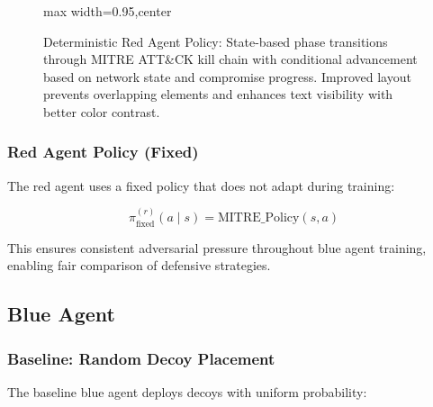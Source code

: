 \documentclass[12pt,oneside,a4paper]{article}
\newcounter{phase}[algorithm]
\theoremstyle{definition}
\theoremstyle{plain}
\begin{document}
\begin{figure}[H]
\begin{adjustbox}{max width=0.95\linewidth,center}
\end{adjustbox}
\caption{Deterministic Red Agent Policy: State-based phase transitions through MITRE ATT\&CK kill chain with conditional advancement based on network state and compromise progress. Improved layout prevents overlapping elements and enhances text visibility with better color contrast.}
\label{fig:red_agent_policy}
\end{figure}

\subsubsection{Red Agent Policy (Fixed)}
The red agent uses a fixed policy that does not adapt during training:

\begin{equation}
\pi^{(r)}_{\text{fixed}}(a \mid s) = \text{MITRE\_Policy}(s, a)
\end{equation}

This ensures consistent adversarial pressure throughout blue agent training, enabling fair comparison of defensive strategies.

\subsection{Blue Agent}

\subsubsection{Baseline: Random Decoy Placement}
The baseline blue agent deploys decoys with uniform probability:
\end{document}
